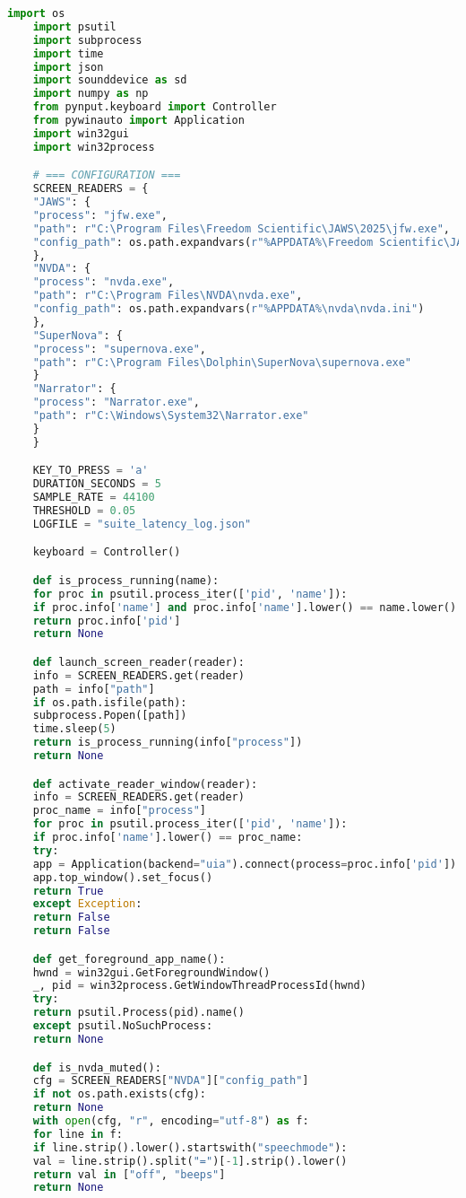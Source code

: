 \begin{lstlisting}[language=Python]
	import os
	import psutil
	import subprocess
	import time
	import json
	import sounddevice as sd
	import numpy as np
	from pynput.keyboard import Controller
	from pywinauto import Application
	import win32gui
	import win32process

	# === CONFIGURATION ===
	SCREEN_READERS = {
	"JAWS": {
	"process": "jfw.exe",
	"path": r"C:\Program Files\Freedom Scientific\JAWS\2025\jfw.exe",
	"config_path": os.path.expandvars(r"%APPDATA%\Freedom Scientific\JAWS\2025\Settings\enu\default.jcf")
	},
	"NVDA": {
	"process": "nvda.exe",
	"path": r"C:\Program Files\NVDA\nvda.exe",
	"config_path": os.path.expandvars(r"%APPDATA%\nvda\nvda.ini")
	},
	"SuperNova": {
	"process": "supernova.exe",
	"path": r"C:\Program Files\Dolphin\SuperNova\supernova.exe"
	}
	"Narrator": {
	"process": "Narrator.exe",
	"path": r"C:\Windows\System32\Narrator.exe"
	}
	}

	KEY_TO_PRESS = 'a'
	DURATION_SECONDS = 5
	SAMPLE_RATE = 44100
	THRESHOLD = 0.05
	LOGFILE = "suite_latency_log.json"

	keyboard = Controller()

	def is_process_running(name):
	for proc in psutil.process_iter(['pid', 'name']):
	if proc.info['name'] and proc.info['name'].lower() == name.lower():
	return proc.info['pid']
	return None

	def launch_screen_reader(reader):
	info = SCREEN_READERS.get(reader)
	path = info["path"]
	if os.path.isfile(path):
	subprocess.Popen([path])
	time.sleep(5)
	return is_process_running(info["process"])
	return None

	def activate_reader_window(reader):
	info = SCREEN_READERS.get(reader)
	proc_name = info["process"]
	for proc in psutil.process_iter(['pid', 'name']):
	if proc.info['name'].lower() == proc_name:
	try:
	app = Application(backend="uia").connect(process=proc.info['pid'])
	app.top_window().set_focus()
	return True
	except Exception:
	return False
	return False

	def get_foreground_app_name():
	hwnd = win32gui.GetForegroundWindow()
	_, pid = win32process.GetWindowThreadProcessId(hwnd)
	try:
	return psutil.Process(pid).name()
	except psutil.NoSuchProcess:
	return None

	def is_nvda_muted():
	cfg = SCREEN_READERS["NVDA"]["config_path"]
	if not os.path.exists(cfg):
	return None
	with open(cfg, "r", encoding="utf-8") as f:
	for line in f:
	if line.strip().lower().startswith("speechmode"):
	val = line.strip().split("=")[-1].strip().lower()
	return val in ["off", "beeps"]
	return None


\end{lstlisting}
